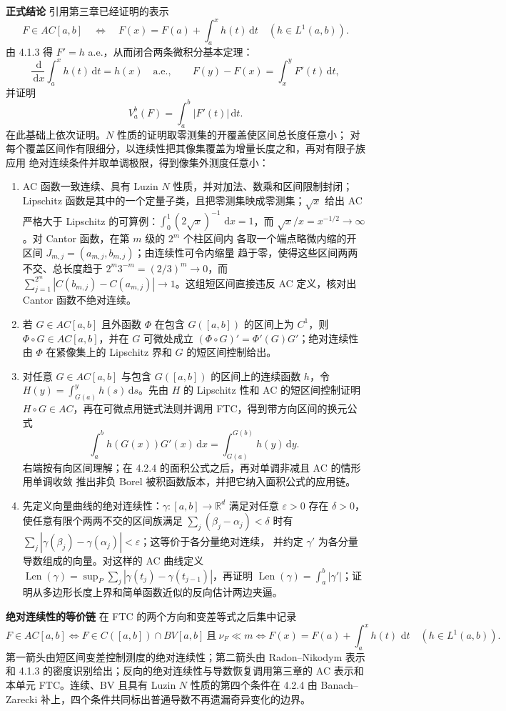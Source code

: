 \documentclass[11pt,a4paper]{ctexart}
\newcommand{\R}{\mathbb R}
\newcommand{\dd}{\,\mathrm d}
\newcommand{\planitem}[1]{\par\smallskip\noindent\textcolor{deepblue}{\textbf{#1}}\quad}
\begin{document}
\planitem{正式结论}
引用第三章已经证明的表示
\[
F\in AC[a,b]
\quad\Longleftrightarrow\quad
F(x)=F(a)+\int_a^xh(t)\dd t\quad(h\in L^1(a,b)).
\]
由 4.1.3 得 $F'=h$ a.e.，从而闭合两条微积分基本定理：
\[
\frac{\dd}{\dd x}\int_a^xh(t)\dd t=h(x)\quad\text{a.e.},
\qquad
F(y)-F(x)=\int_x^yF'(t)\dd t,
\]
并证明
\[
V_a^b(F)=\int_a^b|F'(t)|\dd t.
\]
在此基础上依次证明。$N$ 性质的证明取零测集的开覆盖使区间总长度任意小；
对每个覆盖区间作有限细分，以连续性把其像集覆盖为增量长度之和，再对有限子族应用
绝对连续条件并取单调极限，得到像集外测度任意小：
\begin{enumerate}
\item AC 函数一致连续、具有 Luzin $N$ 性质，并对加法、数乘和区间限制封闭；
Lipschitz 函数是其中的一个定量子类，且把零测集映成零测集；$\sqrt{x}$ 给出 AC
严格大于 Lipschitz 的可算例：$\int_0^1(2\sqrt{x})^{-1}\,\dd x=1$，而
$\sqrt{x}/x=x^{-1/2}\to\infty$。对 Cantor 函数，在第 $m$ 级的 $2^m$ 个柱区间内
各取一个端点略微内缩的开区间 $J_{m,j}=(a_{m,j},b_{m,j})$；由连续性可令内缩量
趋于零，使得这些区间两两不交、总长度趋于
$2^m3^{-m}=(2/3)^m\to0$，而
$\sum_{j=1}^{2^m}|C(b_{m,j})-C(a_{m,j})|\to1$。这组短区间直接违反 AC
定义，核对出 Cantor 函数不绝对连续。
\item 若 $G\in AC[a,b]$ 且外函数 $\Phi$ 在包含 $G([a,b])$ 的区间上为 $C^1$，则
$\Phi\circ G\in AC[a,b]$，并在 $G$ 可微处成立
$(\Phi\circ G)'=\Phi'(G)G'$；绝对连续性由 $\Phi$ 在紧像集上的 Lipschitz 界和
$G$ 的短区间控制给出。
\item 对任意 $G\in AC[a,b]$ 与包含 $G([a,b])$ 的区间上的连续函数 $h$，令
 $H(y)=\int_{G(a)}^yh(s)\dd s$。先由 $H$ 的 Lipschitz 性和 AC 的短区间控制证明
 $H\circ G\in AC$，再在可微点用链式法则并调用 FTC，得到带方向区间的换元公式
\[
\int_a^bh(G(x))G'(x)\dd x
=\int_{G(a)}^{G(b)}h(y)\dd y.
\]
 右端按有向区间理解；在 4.2.4 的面积公式之后，再对单调非减且 AC 的情形用单调收敛
 推出非负 Borel 被积函数版本，并把它纳入面积公式的应用链。
\item 先定义向量曲线的绝对连续性：$\gamma:[a,b]\to\R^d$ 满足对任意
$\varepsilon>0$ 存在 $\delta>0$，使任意有限个两两不交的区间族满足
$\sum_j(\beta_j-\alpha_j)<\delta$ 时有
$\sum_j|\gamma(\beta_j)-\gamma(\alpha_j)|<\varepsilon$；这等价于各分量绝对连续，
并约定 $\gamma'$ 为各分量导数组成的向量。对这样的 AC 曲线定义
$\operatorname{Len}(\gamma)=\sup_P\sum_j|\gamma(t_j)-\gamma(t_{j-1})|$，再证明
$\operatorname{Len}(\gamma)=\int_a^b|\gamma'|$；证明从多边形长度上界和简单函数近似的反向估计两边夹逼。
\end{enumerate}

\planitem{绝对连续性的等价链}
在 FTC 的两个方向和变差等式之后集中记录
\[
 F\in AC[a,b]
 \Longleftrightarrow F\in C([a,b])\cap BV[a,b]\ \text{且}\ \nu_F\ll m
 \Longleftrightarrow
 F(x)=F(a)+\int_a^xh(t)\,\dd t\quad(h\in L^1(a,b)).
\]
第一箭头由短区间变差控制测度的绝对连续性；第二箭头由 Radon--Nikodym 表示和
4.1.3 的密度识别给出；反向的绝对连续性与导数恢复调用第三章的 AC 表示和本单元
FTC。连续、BV 且具有 Luzin $N$ 性质的第四个条件在 4.2.4 由 Banach--Zarecki
补上，四个条件共同标出普通导数不再遗漏奇异变化的边界。
\end{document}
